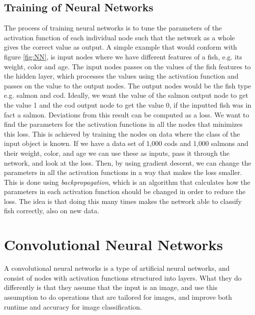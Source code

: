 \newpage

\subsection{Training of Neural Networks}
\label{sec:training}
The process of training neural networks is to tune the parameters of the activation function of each individual node such that the network as a whole gives the correct value as output. A simple example that would conform with figure \ref{fig:NN}, is input nodes where we have different features of a fish, e.g. its weight, color and age. The input nodes passes on the values of the fish features to the hidden layer, which processes the values using the activation function and passes on the value to the output nodes. The output nodes would be the fish type e.g. salmon and cod. Ideally, we want the value of the salmon output node to get the value 1 and the cod output node to get the value 0, if the inputted fish was in fact a salmon. Deviations from this result can be computed as a loss. We want to find the parameters for the activation functions in all the nodes that minimizes this loss. This is achieved by training the nodes on data where the class of the input object is known. If we have a data set of 1,000 cods and 1,000 salmons and their weight, color, and age we can use these as inputs, pass it through the network, and look at the loss. Then, by using gradient descent, we can change the parameters in all the activation functions in a way that makes the loss smaller. This is done using \textit{backpropagation}, which is an algorithm that calculates how the parameters in each activation function should be changed in order to reduce the loss. The idea is that doing this many times makes the network able to classify fish correctly, also on new data. 


\section{Convolutional Neural Networks}

A convolutional neural networks is a type of artificial neural networks, and consist of nodes with activation functions structured into layers. What they do differently is that they assume that the input is an image, and use this assumption to do operations that are tailored for images, and improve both runtime and accuracy for image classification. 

